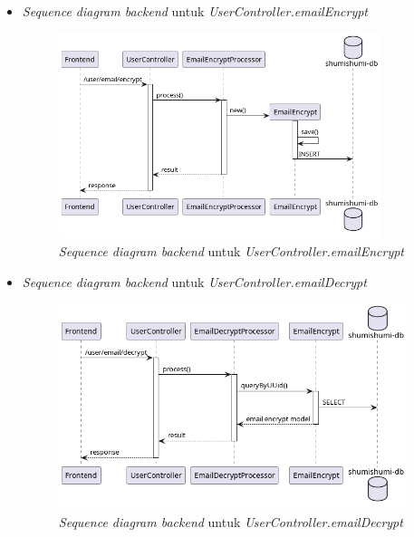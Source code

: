 \documentclass[a4paper]{article}
\begin{document}
\begin{enumerate}
\begin{enumerate}
\begin{itemize}
            \newpage
            \item \textit{Sequence diagram backend} untuk \textit{UserController.emailEncrypt}
            \begin{figure}[h]
                \centering
                \includegraphics*[height=6cm]{diagram/sequence diagram/BE/user controller/emailEncrypt/emailEncrypt.png}
                \caption{\textit{Sequence diagram backend} untuk \textit{UserController.emailEncrypt}}
            \end{figure}

            \item \textit{Sequence diagram backend} untuk \textit{UserController.emailDecrypt}
            \begin{figure}[h]
                \centering
                \includegraphics*[height=6cm]{diagram/sequence diagram/BE/user controller/emailDecrypt/emailDecrypt.png}
                \caption{\textit{Sequence diagram backend} untuk \textit{UserController.emailDecrypt}}
            \end{figure}


\end{itemize}
\end{enumerate}
\end{enumerate}
\end{document}
